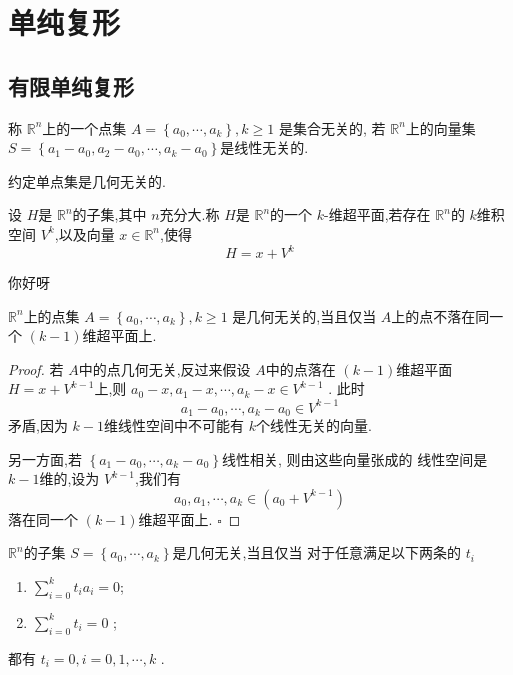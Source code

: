 \documentclass[../../几何与拓扑.tex]{subfiles}
\begin{document}
    
\chapter{单纯复形}

\section{有限单纯复形}

\begin{definition}
    称 \(  \mathbb{R} ^{n}  \)上的一个点集 \(  A =  \left\{  a_0,\cdots,a_{k}  \right\} ,k\ge 1 \)  是集合无关的,
    若 \(  \mathbb{R} ^{n}  \)上的向量集 \(  S =  \left\{ a_1-a_0,a_2-a_0,\cdots ,a_{k}-a_0 \right\}  \)是线性无关的.
    
    约定单点集是几何无关的.
\end{definition}


\begin{definition}
    设 \(  H  \)是 \(  \mathbb{R} ^{n}  \)的子集,其中 \(  n  \)充分大.称 \(  H  \)是 \(  \mathbb{R} ^{n}  \)的一个 \(  k  \)-维超平面,若存在 \(  \mathbb{R} ^{n}  \)的
     \(  k  \)维积空间 \(  V^{k}  \),以及向量 \(  x \in \mathbb{R} ^{n}  \),使得 \[
     H =  x+ V^{k}
     \]          
\end{definition}
你好呀


\begin{proposition}
    \(  \mathbb{R} ^{n}  \)上的点集 \(  A =  \left\{  a_0,\cdots,a_{k}  \right\}, k \ge 1  \) 是几何无关的,当且仅当 \(  A  \)上的点不落在同一个
    \(  \left( k-1 \right)   \)维超平面上.  
\end{proposition}

\begin{proof}

   若 \(  A  \)中的点几何无关,反过来假设  \(  A  \)中的点落在 \(  \left( k-1 \right)   \)维超平面 \(  H =  x+ V^{k-1}  \)上,则 \(  a_0-x,a_1-x  ,\cdots ,a_{k}-x  \in V^{k-1}\)    .
    此时 \[
    a_1-a_0,\cdots ,a_{k}-a_0 \in V^{k-1}
    \]矛盾,因为 \(  k-1  \)维线性空间中不可能有 \(  k  \)个线性无关的向量.
    
    
    另一方面,若 \(  \left\{ a_1-a_0,\cdots ,a_{k}-a_0 \right\}  \)线性相关, 则由这些向量张成的
    线性空间是 \(  k-1  \)维的,设为 \(  V^{k-1}  \),我们有 \[
    a_0,a_1,\cdots ,a_{k} \in \left( a_0+ V^{k-1} \right) 
    \]  落在同一个 \(  \left( k-1 \right)   \)维超平面上. 
    \hfill $\square$
\end{proof}

\begin{proposition}
     \(  \mathbb{R} ^{n}  \)的子集 \(  S =  \left\{  a_0,\cdots,a_{k}    \right\}  \)是几何无关,当且仅当 
     对于任意满足以下两条的 \(  t_{i}  \) \begin{enumerate}
        \item \(  \sum _{i= 0}^{k} t_{i}a_{i}= 0  \);
        \item \(  \sum _{i= 0}^{k} t_{i}= 0  \)  ;
     \end{enumerate}
     都有 \(  t_{i}= 0, i= 0, 1,\cdots,k   \) .
        
\end{proposition}
\end{document}

